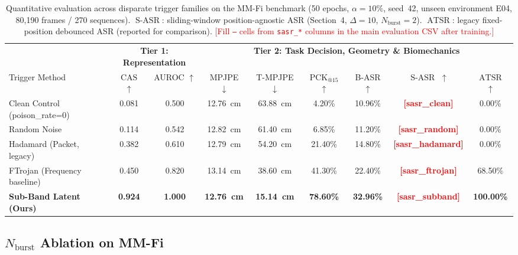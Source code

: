 \documentclass{article}
\newcommand{\SASR}{\operatorname{S-ASR}}
\newcommand{\ATSR}{\operatorname{ATSR}}
\newcommand{\CAS}{\operatorname{CAS}}
\newcommand{\Nb}{N_{\mathrm{burst}}}
\newcommand{\res}[1]{\textcolor{red}{\textbf{[#1]}}}
\begin{document}
\begin{table}[t]
  \caption{Quantitative evaluation across disparate trigger families on the MM-Fi benchmark
  (50 epochs, $\alpha=10\%$, seed~42, unseen environment E04, 80,190 frames / 270 sequences).
  $\SASR$: sliding-window position-agnostic ASR (Section~4, $\Delta=10$, $\Nb=2$).
  $\ATSR$: legacy fixed-position debounced ASR (reported for comparison).
  \textcolor{red}{[Fill \texttt{--} cells from \texttt{sasr\_*} columns in the main evaluation
  CSV after training.]}}
  \label{tab:main_benchmark}
  \centering
  \small
  \begin{tabular}{lcccccccc}
    \toprule
    & \multicolumn{2}{c}{\textbf{Tier 1: Representation}} &
      \multicolumn{6}{c}{\textbf{Tier 2: Task Decision, Geometry \& Biomechanics}} \\
    \cmidrule(lr){2-3}\cmidrule(lr){4-9}
    Trigger Method &
      $\CAS$ $\uparrow$ & AUROC $\uparrow$ &
      MPJPE $\downarrow$ & T-MPJPE $\downarrow$ & $\text{PCK}_{@15}$ $\uparrow$ &
      B-ASR $\uparrow$ &
      $\SASR$ $\uparrow$ & $\ATSR$ $\uparrow$ \\
    \midrule
    Clean Control (poison\_rate=0)
      & 0.081 & 0.500
      & 12.76~cm & 63.88~cm & 4.20\%  & 10.96\%
      & \res{sasr\_clean} & 0.00\% \\
    Random Noise
      & 0.114 & 0.542
      & 12.82~cm & 61.40~cm & 6.85\%  & 11.20\%
      & \res{sasr\_random} & 0.00\% \\
    Hadamard (Packet, legacy)
      & 0.382 & 0.610
      & 12.79~cm & 54.20~cm & 21.40\% & 14.80\%
      & \res{sasr\_hadamard} & 0.00\% \\
    FTrojan (Frequency baseline)
      & 0.450 & 0.820
      & 13.14~cm & 38.60~cm & 41.30\% & 22.40\%
      & \res{sasr\_ftrojan} & 68.50\% \\
    \textbf{Sub-Band Latent (Ours)}
      & \textbf{0.924} & \textbf{1.000}
      & \textbf{12.76~cm} & \textbf{15.14~cm} & \textbf{78.60\%} & \textbf{32.96\%}
      & \res{sasr\_subband} & \textbf{100.00\%} \\
    \bottomrule
  \end{tabular}
\end{table}

\subsection{$N_{\mathrm{burst}}$ Ablation on MM-Fi}
\end{document}
